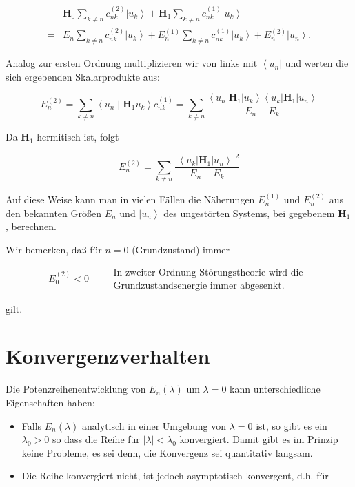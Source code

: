 \documentclass[10pt, letterpaper]{article}
\begin{document}
$$
\begin{aligned}
& \mathbf{H}_{0} \sum_{k \neq n} c_{n k}^{(2)}\left|u_{k}\right\rangle+\mathbf{H}_{1} \sum_{k \neq n} c_{n k}^{(1)}\left|u_{k}\right\rangle \\
= & E_{n} \sum_{k \neq n} c_{n k}^{(2)}\left|u_{k}\right\rangle+E_{n}^{(1)} \sum_{k \neq n} c_{n k}^{(1)}\left|u_{k}\right\rangle+E_{n}^{(2)}\left|u_{n}\right\rangle .
\end{aligned}
$$

Analog zur ersten Ordnung multiplizieren wir von links mit $\left\langle u_{n}\right|$ und werten die sich ergebenden Skalarprodukte aus:

$$
E_{n}^{(2)}=\sum_{k \neq n}\left\langle u_{n} \mid \mathbf{H}_{1} u_{k}\right\rangle c_{n k}^{(1)}=\sum_{k \neq n} \frac{\left\langle u_{n}\right| \mathbf{H}_{1}\left|u_{k}\right\rangle\left\langle u_{k}\right| \mathbf{H}_{1}\left|u_{n}\right\rangle}{E_{n}-E_{k}}
$$

Da $\mathbf{H}_{1}$ hermitisch ist, folgt

$$
E_{n}^{(2)}=\sum_{k \neq n} \frac{\left.\left|\left\langle u_{k}\right| \mathbf{H}_{1}\right| u_{n}\right\rangle\left.\right|^{2}}{E_{n}-E_{k}}
$$

Auf diese Weise kann man in vielen Fällen die Näherungen $E_{n}^{(1)}$ und $E_{n}^{(2)}$ aus den bekannten Größen $E_{n}$ und $\left|u_{n}\right\rangle$ des ungestörten Systems, bei gegebenem $\mathbf{H}_{1}$, berechnen.

Wir bemerken, daß für $n=0$ (Grundzustand) immer

$$
E_{0}^{(2)}<0 \quad \begin{aligned}
& \text { In zweiter Ordnung Störungstheorie wird die } \\
& \text { Grundzustandsenergie immer abgesenkt. }
\end{aligned}
$$

gilt.

\section*{Konvergenzverhalten}
Die Potenzreihenentwicklung von $E_{n}(\lambda)$ um $\lambda=0$ kann unterschiedliche Eigenschaften haben:

\begin{itemize}
  \item Falls $E_{n}(\lambda)$ analytisch in einer Umgebung von $\lambda=0$ ist, so gibt es ein $\lambda_{0}>0$ so dass die Reihe für $|\lambda|<\lambda_{0}$ konvergiert. Damit gibt es im Prinzip keine Probleme, es sei denn, die Konvergenz sei quantitativ langsam.
  \item Die Reihe konvergiert nicht, ist jedoch asymptotisch konvergent, d.h. für
\end{itemize}
\end{document}
